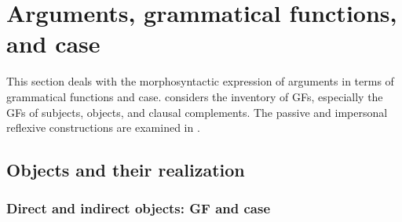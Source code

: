 \documentclass[output=paper,hidelinks]{langscibook}
\begin{document}
\section{Arguments, grammatical functions, and case}
\label{sec:Romance:3}

This section deals with the morphosyntactic expression of arguments in terms of grammatical functions and case.  considers the inventory of GFs, especially the GFs of subjects, objects, and clausal complements. The passive and impersonal reflexive constructions are examined in . 

\subsection{Objects and their realization}
\label{sec:Romance:3.1}

\subsubsection{Direct and indirect objects: GF and case}
\label{sec:Romance:3.1.1}
\end{document}
